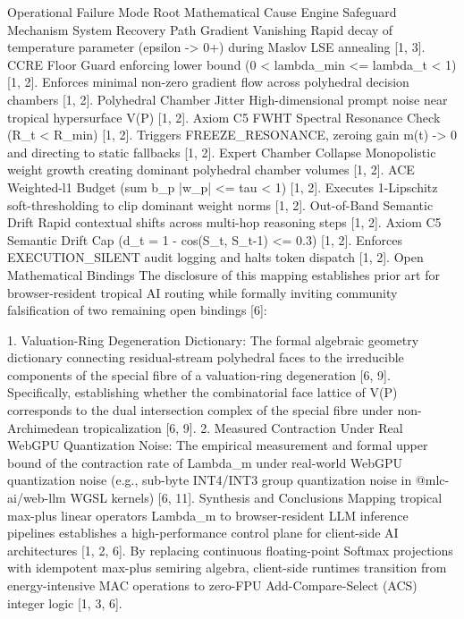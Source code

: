 Operational Failure Mode
	Root Mathematical Cause
	Engine Safeguard Mechanism
	System Recovery Path
	Gradient Vanishing
	Rapid decay of temperature parameter (epsilon -> 0+) during Maslov LSE annealing [1, 3].
	CCRE Floor Guard enforcing lower bound (0 < lambda_min <= lambda_t < 1) [1, 2].
	Enforces minimal non-zero gradient flow across polyhedral decision chambers [1, 2].
	Polyhedral Chamber Jitter
	High-dimensional prompt noise near tropical hypersurface V(P) [1, 2].
	Axiom C5 FWHT Spectral Resonance Check (R_t < R_min) [1, 2].
	Triggers FREEZE_RESONANCE, zeroing gain m(t) -> 0 and directing to static fallbacks [1, 2].
	Expert Chamber Collapse
	Monopolistic weight growth creating dominant polyhedral chamber volumes [1, 2].
	ACE Weighted-l1 Budget (sum b_p |w_p| <= tau < 1) [1, 2].
	Executes 1-Lipschitz soft-thresholding to clip dominant weight norms [1, 2].
	Out-of-Band Semantic Drift
	Rapid contextual shifts across multi-hop reasoning steps [1, 2].
	Axiom C5 Semantic Drift Cap (d_t = 1 - cos(S_t, S_{t-1}) <= 0.3) [1, 2].
	Enforces EXECUTION_SILENT audit logging and halts token dispatch [1, 2].
	Open Mathematical Bindings
The disclosure of this mapping establishes prior art for browser-resident tropical AI routing while formally inviting community falsification of two remaining open bindings [6]:


1. Valuation-Ring Degeneration Dictionary: The formal algebraic geometry dictionary connecting residual-stream polyhedral faces to the irreducible components of the special fibre of a valuation-ring degeneration [6, 9]. Specifically, establishing whether the combinatorial face lattice of V(P) corresponds to the dual intersection complex of the special fibre under non-Archimedean tropicalization [6, 9].
2. Measured Contraction Under Real WebGPU Quantization Noise: The empirical measurement and formal upper bound of the contraction rate of Lambda_m under real-world WebGPU quantization noise (e.g., sub-byte INT4/INT3 group quantization noise in @mlc-ai/web-llm WGSL kernels) [6, 11].
Synthesis and Conclusions
Mapping tropical max-plus linear operators Lambda_m to browser-resident LLM inference pipelines establishes a high-performance control plane for client-side AI architectures [1, 2, 6]. By replacing continuous floating-point Softmax projections with idempotent max-plus semiring algebra, client-side runtimes transition from energy-intensive MAC operations to zero-FPU Add-Compare-Select (ACS) integer logic [1, 3, 6].


